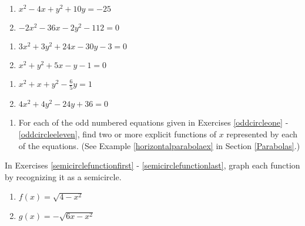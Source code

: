 \documentclass{ximera}
\begin{document}
\begin{multicols}{2}
\begin{enumerate}
\setcounter{enumi}{\value{HW}}

\item $x^{2} - 4x + y^{2} + 10y = -25$  \label{ctscirclefirst}  \label{oddcircleseven}
\item $-2x^{2} - 36x - 2y^{2} - 112 = 0$

\setcounter{HW}{\value{enumi}}
\end{enumerate}
\end{multicols}

\begin{multicols}{2}
\begin{enumerate}
\setcounter{enumi}{\value{HW}}


\item $3x^2+3y^2+24x-30y -3 =0$  \label{oddcirclenine}
\item $x^2+y^2+5x-y-1=0$

\setcounter{HW}{\value{enumi}}
\end{enumerate}
\end{multicols}

\begin{multicols}{2}
\begin{enumerate}
\setcounter{enumi}{\value{HW}}


\item $x^{2} + x + y^{2} - \frac{6}{5}y = 1$  \label{oddcircleeleven}
\item $4x^{2} + 4y^{2} - 24y + 36 = 0$ \label{ctscirclelast}

\setcounter{HW}{\value{enumi}}
\end{enumerate}
\end{multicols}

\begin{enumerate}
\setcounter{enumi}{\value{HW}}

\item For each of the odd numbered equations given in Exercises \ref{oddcircleone} - \ref{oddcircleeleven}, find two or more explicit functions of $x$ represented by each of the equations.  (See Example \ref{horizontalparabolaex} in Section \ref{Parabolas}.)

\setcounter{HW}{\value{enumi}}
\end{enumerate}


In Exercises \ref{semicirclefunctionfirst} - \ref{semicirclefunctionlast}, graph each function by recognizing it as a semicircle.

\begin{multicols}{2}
\begin{enumerate}
\setcounter{enumi}{\value{HW}}

\item   $f(x) = \sqrt{4-x^2}$ \label{semicirclefunctionfirst}
\item   $g(x) = -\sqrt{6x-x^2}$

\setcounter{HW}{\value{enumi}}
\end{enumerate}
\end{multicols}
\end{document}
